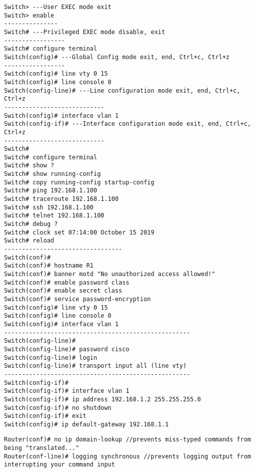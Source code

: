 \documentclass[../EngineeringJournal_CDavis.tex]{subfiles}
\begin{document}
\hspace{0.2cm}
\begin{tcolorbox}[width=6.3in]
\scriptsize 
\begin{verbatim}
Switch> ---User EXEC mode exit
Switch> enable
---------------
Switch# ---Privileged EXEC mode disable, exit
-----------------
Switch# configure terminal
Switch(config)# ---Global Config mode exit, end, Ctrl+c, Ctrl+z
-----------------
Switch(config)# line vty 0 15
Switch(config)# line console 0
Switch(config-line)# ---Line configuration mode exit, end, Ctrl+c, Ctrl+z
----------------------------
Switch(config)# interface vlan 1
Switch(config-if)# ---Interface configuration mode exit, end, Ctrl+c, Ctrl+z
----------------------------
Switch#
Switch# configure terminal
Switch# show ?
Switch# show running-config
Switch# copy running-config startup-config
Switch# ping 192.168.1.100
Switch# traceroute 192.168.1.100
Switch# ssh 192.168.1.100
Switch# telnet 192.168.1.100
Switch# debug ?
Switch# clock set 07:14:00 October 15 2019
Switch# reload
---------------------------------
Switch(conf)#
Switch(conf)# hostname R1
Switch(conf)# banner motd "No unauthorized access allowed!"
Switch(conf)# enable password class
Switch(conf)# enable secret class
Switch(conf)# service password-encryption
Switch(config)# line vty 0 15
Switch(config)# line console 0
Switch(config)# interface vlan 1
----------------------------------------------------
Switch(config-line)#
Switch(config-line)# password cisco
Switch(config-line)# login
Switch(config-line)# transport input all (line vty)
----------------------------------------------------
Switch(config-if)#
Switch(config-if)# interface vlan 1
Switch(config-if)# ip address 192.168.1.2 255.255.255.0
Switch(config-if)# no shutdown
Switch(config-if)# exit
Switch(config)# ip default-gateway 192.168.1.1
\end{verbatim}
\end{tcolorbox}
\hspace{0.2cm}
\normalsize  

\hspace{0.2cm}
\begin{tcolorbox}[width=6.3in]
\scriptsize 
\begin{verbatim}
Router(conf)# no ip domain-lookup //prevents miss-typed commands from being "translated..."
Router(conf-line)# logging synchronous //prevents logging output from interrupting your command input
\end{verbatim}
\end{tcolorbox}
\hspace{0.2cm}
\normalsize  
\end{document}
